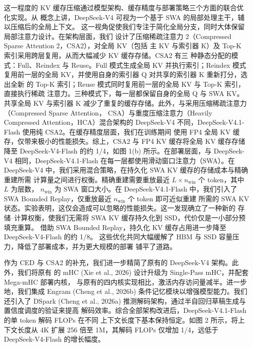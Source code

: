 \documentclass[
  10
]{article}
\begin{document}
这一程度的 KV 缓存压缩通过模型架构、缓存精度与部署策略三个方面的联合优化实现。从
概念上讲，DeepSeek-V4 可视为一个基于 SWA 的局部处理主干，辅以压缩后的全局上下文。
这一视角促使我们专注于简化全局分支，同时大体保留局部注意力设计。在架构层面，我们
设计了压缩稀疏注意力 2（Compressed Sparse Attention 2，CSA2），对全局 KV（包括
主 KV 与索引器 K）及 Top-K 索引采用跨层复用，从而大幅减少 KV 缓存存储。CSA2 有三
种静态分配的模式：Full、Reindex 与 Reuse。Full 模式生成全局 KV 并执行索引；Reindex
模式复用前一层的全局 KV，并使用自身的索引器 Q 对共享的索引器 K 重新打分，选出全新
的 Top-K 索引；Reuse 模式同时复用前一层的全局 KV 与 Top-K 索引，直接执行稀疏
注意力。三种模式下，每一层都保留自身的全局 Q 与 SWA KV。共享全局 KV 与索引器 K
减少了重复的缓存存储。此外，与采用压缩稀疏注意力（Compressed Sparse Attention，
CSA）与重度压缩注意力（Heavily Compressed Attention，HCA）混合架构的
DeepSeek-V4 不同，DeepSeek-V4.1-Flash 使用纯 CSA2。在缓存精度层面，我们在训练期间
使用 FP4 全局 KV 缓存，仅带来极小的性能损失。综上，CSA2 与 FP4 KV 缓存将全局 KV
缓存存储降至 DeepSeek-V4-Flash 的约 1/4，如图 1(b) 所示。在部署层面，与
DeepSeek-V4 相同，DeepSeek-V4.1-Flash 在每一层都使用滑动窗口注意力（SWA）。在
DeepSeek-V4 中，我们采用混合策略，在持久化 SWA KV 缓存的存储成本与精确重建所需
计算量之间进行权衡。精确重建需要重放最近
\(L \times n _ { \mathrm { w i n } }\) 个 token，其中 $L$ 为层数，
\(n _ { \mathrm { w i n } }\) 为 SWA 窗口大小。在 DeepSeek-V4.1-Flash 中，我们引入了
SWA Bounded Replay，仅重放最近 \(n _ { \mathrm { w i n } }\) 个 token 即可近似重建
所需的 SWA KV 状态。实验表明，这仅会造成可以忽略的性能损失。这一发现确立了一种新的
存储--计算权衡，使我们无需将 SWA KV 缓存持久化到 SSD，代价仅是一小部分预填充重算。
借助 SWA Bounded Replay，持久化 KV 缓存占用进一步降至 DeepSeek-V4-Flash 的约 1/8。
这些优化共同大幅缓解了 HBM 与 SSD 容量压力，降低了部署成本，并为更大规模的部署
铺平了道路。




作为 CED 与 CSA2 的补充，我们进一步精简了原有的 DeepSeek-V4 架构。此外，我们将原有
的 mHC (Xie et al., 2026) 设计升级为 Single-Pass mHC，并配套 Mega-mHC 部署内核，
与原有的四内核实现相比，激活内存访问量减半。进一步地，我们集成 Engram
(Cheng et al., 2026b) 条件记忆模块以增强模型能力。我们还引入了 DSpark
(Cheng et al., 2026a) 推测解码架构，通过半自回归草稿生成与置信度调度的验证来提高
解码效率。综合全部架构改进后，DeepSeek-V4.1-Flash 的单 token 解码 FLOPs 在不同
上下文长度下基本保持恒定。如图 2 所示，将上下文长度从 4K 扩展 256 倍至 1M，其解码
FLOPs 仅增加 1/4，远低于 DeepSeek-V4-Flash 的增长幅度。
\end{document}

